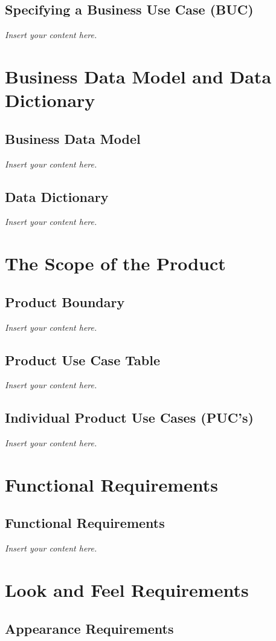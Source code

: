 \documentclass[12pt]{article}
\newcommand{\lips}{\textit{Insert your content here.}}
\begin{document}
\subsection{Specifying a Business Use Case (BUC)}
\lips

\section{Business Data Model and Data Dictionary}
\subsection{Business Data Model}
\lips
\subsection{Data Dictionary}
\lips

\section{The Scope of the Product}
\subsection{Product Boundary}
\lips
\subsection{Product Use Case Table}
\lips
\subsection{Individual Product Use Cases (PUC's)}
\lips

\section{Functional Requirements}
\subsection{Functional Requirements}
\lips

\section{Look and Feel Requirements}
\subsection{Appearance Requirements}
\end{document}
